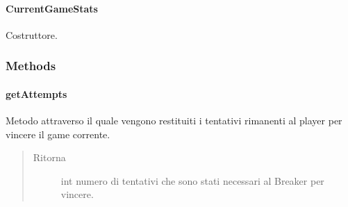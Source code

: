 \documentclass[letterpaper,10pt,italian]{sphinxmanual}
\begin{document}
\paragraph{CurrentGameStats}
\label{\detokenize{source/it/unicam/cs/pa/mastermind/gamecore/CurrentGameStats:id1}}

\begin{fulllineitems}
\label{\detokenize{source/it/unicam/cs/pa/mastermind/gamecore/CurrentGameStats:it.unicam.cs.pa.mastermind.gamecore.CurrentGameStats.CurrentGameStats(BoardModel)}}
Costruttore.

\end{fulllineitems}



\subsubsection{Methods}
\label{\detokenize{source/it/unicam/cs/pa/mastermind/gamecore/CurrentGameStats:methods}}

\paragraph{getAttempts}
\label{\detokenize{source/it/unicam/cs/pa/mastermind/gamecore/CurrentGameStats:getattempts}}

\begin{fulllineitems}
\label{\detokenize{source/it/unicam/cs/pa/mastermind/gamecore/CurrentGameStats:it.unicam.cs.pa.mastermind.gamecore.CurrentGameStats.getAttempts()}}
Metodo attraverso il quale vengono restituiti i tentativi rimanenti al player per vincere il game corrente.
\begin{quote}\begin{description}
\item[{Ritorna}] \leavevmode
int numero di tentativi che sono stati necessari al Breaker per vincere.

\end{description}\end{quote}

\end{fulllineitems}
\end{document}
